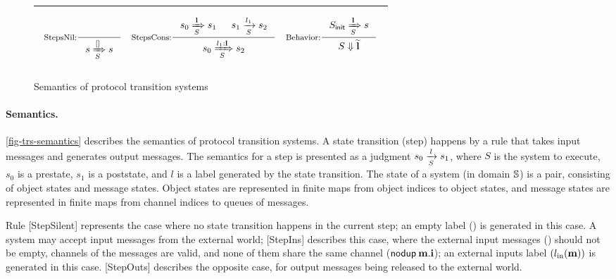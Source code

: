 \begin{figure*}[t]
\begin{tabular}{|c|}
\begin{math}
\begin{array}{ccc}
        \mbox{}\vspace{-5pt} \\ %
        \inference[StepsNil:]{}{\semsteps{S}{s}{\listnil{}}{s}} &
        \inference[StepsCons:]{\semsteps{S}{s_0}{\listof{l}}{s_1}
          & \semstep{S}{s_1}{l_1}{s_2}}{\semsteps{S}{s_0}{\listcons{l_1}{\listof{l}}}{s_2}} &
        \inference[Behavior:]{\semsteps{S}{\sysInit{S}}{\listof{l}}{s}}{\sembeh{S}{\behOf{\listof{l}}}} \\
        \mbox{}\vspace{-5pt} \\ %
      \end{array}
    \end{math}\\
    \hline
  \end{tabular}
  \caption{Semantics of protocol transition systems}
  \vspace{-10pt}
  \label{fig-trs-semantics}
\end{figure*}

\paragraph{Semantics.}
\autoref{fig-trs-semantics} describes the semantics of protocol transition systems.
A state transition (step) happens by a rule that takes input messages and generates output messages.
The semantics for a step is presented as a judgment $\semstep{S}{s_0}{l}{s_1}$, where $S$ is the system to execute, $s_0$ is a prestate, $s_1$ is a poststate, and $l$ is a label generated by the state transition.
The state of a system (in domain $\hsyst{}$) is a pair, consisting of object states and message states.
Object states are represented in finite maps from object indices to object states, and message states are represented in finite maps from channel indices to queues of messages.

Rule [StepSilent] represents the case where no state transition happens in the current step; an empty label (\lblEmpty{}) is generated in this case.
A system may accept input messages from the external world; [StepIns] describes this case, where the external input messages () should not be empty, channels of the messages are valid, and none of them share the same channel ($\nodup{\listof{\idxOf{m}}}$); an external inputs label $(\lblIns{\listof{m}})$ is generated in this case.
[StepOuts] describes the opposite case, for output messages being released to the external world.

